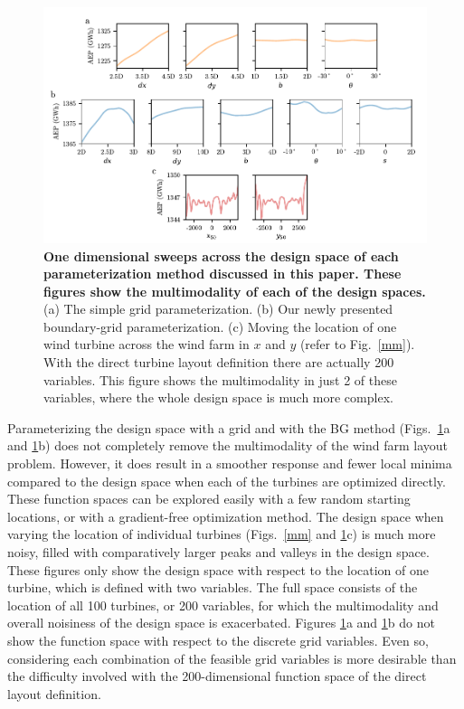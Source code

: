 \documentclass[wes, manuscript]{copernicus}
\begin{document}
\begin{figure}
\centering
\includegraphics{paper-figures/multimodalityR1.pdf}
\caption{ \textbf{One dimensional sweeps across the design space of each parameterization method discussed in this paper. These figures show the multimodality of each of the design spaces.} (a) The simple grid parameterization. (b) Our newly presented boundary-grid parameterization. (c) Moving the location of one wind turbine across the wind farm in $x$ and $y$ (refer to Fig.~\ref{mm}). With the direct turbine layout definition there are actually 200 variables. This figure shows the multimodality in just 2 of these variables, where the whole design space is much more complex.}
\label{multimodality}
\end{figure}

Parameterizing the design space with a grid and with the BG method (Figs.~\ref{multimodality}a and \ref{multimodality}b) does not completely remove the multimodality of the wind farm layout problem. However, it does result in a smoother response and fewer local minima compared to the design space when each of the turbines are optimized directly. These function spaces can be explored easily with a few random starting locations, or with a gradient-free optimization method. 
The design space when varying the location of individual turbines (Figs.~\ref{mm} and \ref{multimodality}c) is much more noisy, filled with comparatively larger peaks and valleys in the design space. These figures only show the design space with respect to the location of one turbine, which is defined with two variables. The full space consists of the location of all 100 turbines, or 200 variables, for which the multimodality and overall noisiness of the design space is exacerbated.
%
Figures \ref{multimodality}a and \ref{multimodality}b do not show the function space with respect to the discrete grid variables. Even so, considering each combination of the feasible grid variables is more desirable than the difficulty involved with the 200-dimensional function space of the direct layout definition.
\end{document}
